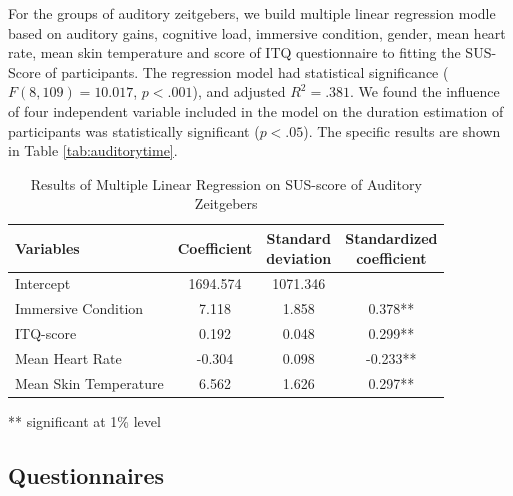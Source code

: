 \documentclass[sigconf]{acmart}
\begin{document}
For the groups of auditory zeitgebers, we build multiple linear regression modle based on auditory gains, cognitive load, immersive condition, gender, mean heart rate, mean skin temperature and score of ITQ questionnaire to fitting the SUS-Score of participants. The regression model had statistical significance ($F(8,109) = 10.017$, $p < .001$), and adjusted $R^2 = .381$. We found the influence of four independent variable included in the model on the duration estimation of participants was statistically significant ($p < .05$). The specific results are shown in Table \ref{tab:auditorytime}.

\begin{table}[htbp] %
 \centering\small
 \begin{threeparttable}
 \caption{Results of Multiple Linear Regression on SUS-score of Auditory Zeitgebers}
 \label{regression}
  \begin{tabular}{lccc} %
  \toprule %
  Variables         & Coefficient & \makecell[c]{Standard\\ deviation} & \makecell[c]{Standardized\\ coefficient} \\
  \midrule %
  Intercept          & 1694.574 & 1071.346  &         \\
  Immersive Condition & 7.118   & 1.858   & 0.378**  \\
  ITQ-score & 0.192   & 0.048   & 0.299**  \\
  Mean Heart Rate & -0.304   & 0.098   & -0.233**  \\
  Mean Skin Temperature & 6.562   & 1.626   & 0.297**  \\
  \bottomrule %
 \end{tabular}
  \label{tab:auditorysus}
  \small
 \begin{tablenotes}
  \item[**] significant at 1\% level
 \end{tablenotes}
 \end{threeparttable}
\end{table}

\subsection{Questionnaires}
\end{document}
